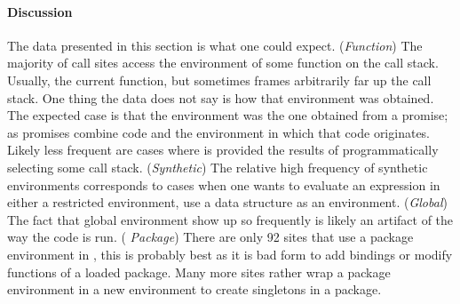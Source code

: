 \documentclass[review,nonacm,screen,acmsmall,anonymous=true]{acmart}
\begin{document}
\paragraph{Discussion}
The data presented in this section is what one could expect. ({\it Function})
The majority of \eval call sites access the environment of some function on the
call stack. Usually, the current function, but sometimes frames arbitrarily far
up the call stack. One thing the data does not say is how that environment was
obtained. The expected case is that the environment was the one obtained from a
promise; as promises combine code and the environment in which that code
originates. Likely less frequent are cases where \eval is provided the results
of programmatically selecting some call stack. ({\it Synthetic}) The relative
high frequency of synthetic environments corresponds to cases when one wants to
evaluate an expression in either a restricted environment, use a data
structure as an environment. ({\it Global}) The fact that global environment
show up so frequently is likely an artifact of the way the code is run. ({\it
  Package}) There are only 92 sites that use a package environment in \eval,
this is probably best as it is bad form to add bindings or modify functions
of a loaded package. Many more sites rather wrap a package environment in a new 
environment to create singletons in a package.


\end{document}
